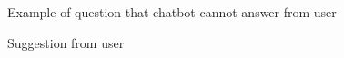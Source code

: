 \documentclass[12pt,oneside,openright,a4paper]{cpe-english-project}
\begin{document}
\begin{figure}[!h]\centering
	\caption{Example of question that chatbot cannot answer from user}
\end{figure}

\begin{figure}[!h]\centering
	\caption{Suggestion from user}
\end{figure}
\end{document}
